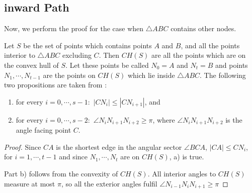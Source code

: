  
%
%




\subsection{inward Path}
Now, we perform the proof for the case when $\triangle{ABC} $ contains other nodes.

Let $S $ be the set of points which contains points $A $ and $B $, and all the points interior to $\triangle{ABC} $ excluding $C $.
Then $CH(S) $ are all the points which are on the convex hull of $S $.
Let these points be called $N_0=A $ and $N_t=B $ and points $N_1 , \cdots ,N_{t-1} $ are the points on $CH(S) $ which lie inside $\triangle{ABC} $. 
The following two propositions are taken from \cite{kanj}:
\begin{prop}
\label{inward_pre}
\begin{enumerate}
\renewcommand{\labelenumi}{\alph{enumi})}
The following are true:
\item for every $i =0,\cdots,s-1: $ $|CN_i| \leq |CN_{i+1}| $, and
\item for every $i=0, \cdots, s-2: $  $\angle{N_{i}N_{i+1}N_{i+2}} \geq \pi $, where $\angle{N_{i}N_{i+1}N_{i+2}} $ is the angle facing point $C $.
\end{enumerate} 
\end{prop}
\begin{proof}
Since $CA $ is the shortest edge in the angular sector $\angle{BCA} $, $|CA| \leq CN_i $, for $i=1 ,\cdots, t-1 $  and since $N_1 , \cdots, N_t $ are on $CH(S) $, a) is true.

Part b) follows from the convexity of $CH(S) $. All interior angles to $CH(S) $ measure at most $\pi $, so all the exterior angles fulfil $\angle{N_{i-1}N_iN_{i+1}}\geq \pi $ 
\end{proof}


